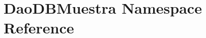 \hypertarget{namespace_dao_d_b_muestra}{}\section{Dao\+D\+B\+Muestra Namespace Reference}
\label{namespace_dao_d_b_muestra}
